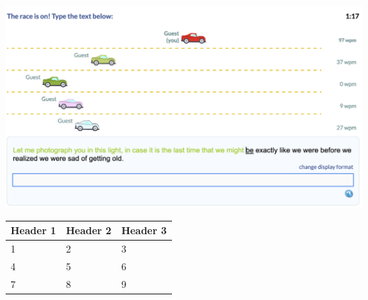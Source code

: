 \documentclass{article}
\begin{document}
\includegraphics{typeracer.png}

\begin{tabularx}{\linewidth}{|X|X|X|}
	\hline
	Header 1 &
	Header 2 &
	Header 3
	\\\hline
	1        &
	2        &
	3
	\\\hline
	4        &
	5        &
	6
	\\\hline
	7        &
	8        &
	9
	\hline %
\end{tabularx}
\end{document}
